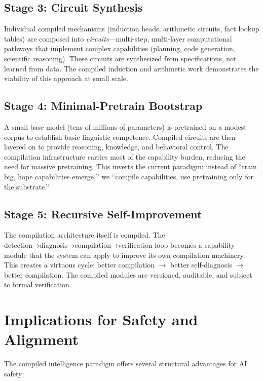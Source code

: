 \documentclass[11pt,a4paper]{article}
\begin{document}
\subsection{Stage 3: Circuit Synthesis}

Individual compiled mechanisms (induction heads, arithmetic circuits, fact lookup tables) are composed into \emph{circuits}---multi-step, multi-layer computational pathways that implement complex capabilities (planning, code generation, scientific reasoning). These circuits are synthesized from specifications, not learned from data. The compiled induction and arithmetic work demonstrates the viability of this approach at small scale.

\subsection{Stage 4: Minimal-Pretrain Bootstrap}

A small base model (tens of millions of parameters) is pretrained on a modest corpus to establish basic linguistic competence. Compiled circuits are then layered on to provide reasoning, knowledge, and behavioral control. The compilation infrastructure carries most of the capability burden, reducing the need for massive pretraining. This inverts the current paradigm: instead of ``train big, hope capabilities emerge,'' we ``compile capabilities, use pretraining only for the substrate.''

\subsection{Stage 5: Recursive Self-Improvement}

The compilation architecture itself is compiled. The detection→diagnosis→compilation→verification loop becomes a capability module that the system can apply to improve its own compilation machinery. This creates a virtuous cycle: better compilation $\rightarrow$ better self-diagnosis $\rightarrow$ better compilation. The compiled modules are versioned, auditable, and subject to formal verification.

\section{Implications for Safety and Alignment}

The compiled intelligence paradigm offers several structural advantages for AI safety:
\end{document}
